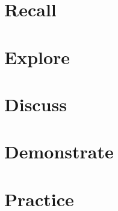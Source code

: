 \documentclass[11pt,letterpaper]{article}
\begin{document}
\maketitle
\thispagestyle{first}

\section*{Recall} %

\section*{Explore}

\section*{Discuss}

\section*{Demonstrate}

\section*{Practice}
\end{document}
